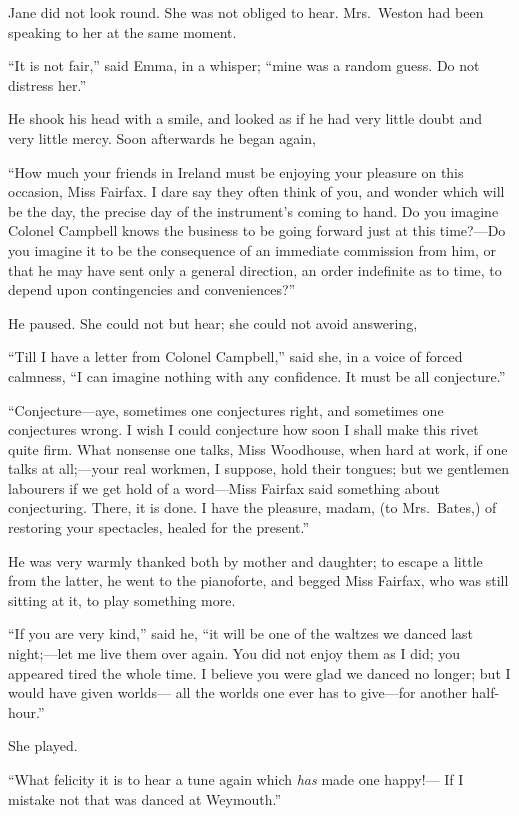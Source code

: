 Jane did not look round.  She was not obliged to hear.  Mrs.\ Weston
had been speaking to her at the same moment.

``It is not fair,'' said Emma, in a whisper; ``mine was a random guess.
Do not distress her.''

He shook his head with a smile, and looked as if he had very little
doubt and very little mercy.  Soon afterwards he began again,

``How much your friends in Ireland must be enjoying your pleasure
on this occasion, Miss Fairfax.  I dare say they often think of you,
and wonder which will be the day, the precise day of the instrument's
coming to hand.  Do you imagine Colonel Campbell knows the business
to be going forward just at this time?---Do you imagine it to be
the consequence of an immediate commission from him, or that he may
have sent only a general direction, an order indefinite as to time,
to depend upon contingencies and conveniences?''

He paused.  She could not but hear; she could not avoid answering,

``Till I have a letter from Colonel Campbell,'' said she, in a voice
of forced calmness, ``I can imagine nothing with any confidence.
It must be all conjecture.''

``Conjecture---aye, sometimes one conjectures right, and sometimes
one conjectures wrong.  I wish I could conjecture how soon I shall
make this rivet quite firm.  What nonsense one talks, Miss Woodhouse,
when hard at work, if one talks at all;---your real workmen,
I suppose, hold their tongues; but we gentlemen labourers if we get
hold of a word---Miss Fairfax said something about conjecturing.
There, it is done.  I have the pleasure, madam, (to Mrs.\ Bates,)
of restoring your spectacles, healed for the present.''

He was very warmly thanked both by mother and daughter; to escape
a little from the latter, he went to the pianoforte, and begged
Miss Fairfax, who was still sitting at it, to play something more.

``If you are very kind,'' said he, ``it will be one of the waltzes
we danced last night;---let me live them over again.  You did not
enjoy them as I did; you appeared tired the whole time.  I believe
you were glad we danced no longer; but I would have given worlds---%
all the worlds one ever has to give---for another half-hour.''

She played.

``What felicity it is to hear a tune again which \emph{has} made one happy!---%
If I mistake not that was danced at Weymouth.''

